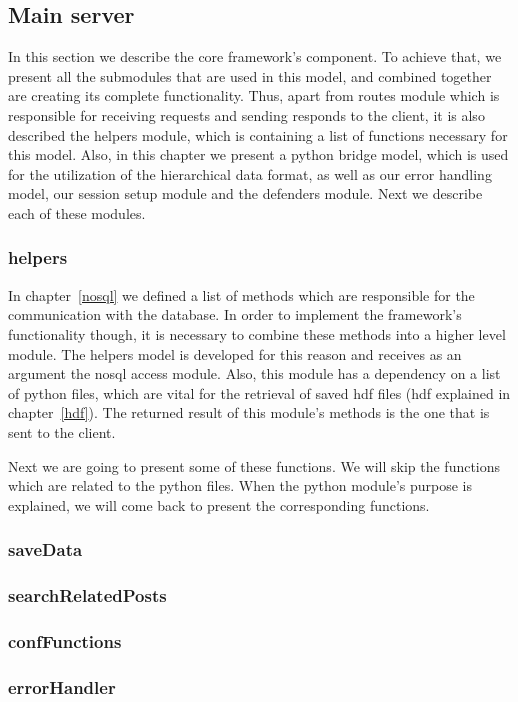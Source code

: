 \subsection{Main server}
In this section we describe the core framework's component. To achieve that, we present all the submodules that are used in this model, and combined together are creating its complete functionality. Thus, apart from routes module which is responsible for receiving requests and sending responds to the client, it is also described the helpers module, which is containing a list of functions necessary for this model. Also, in this chapter we present a python bridge model, which is used for the utilization of the hierarchical data format, as well as our error handling model, our session setup module and the defenders module. Next we describe each of these modules.

\subsubsection{helpers}
In chapter~\ref{nosql} we defined a list of methods which are responsible for the communication with the database. In order to implement the framework's functionality though, it is necessary to combine these methods into a higher level module. The helpers model is developed for this reason and receives as an argument the nosql access module. Also, this module has a dependency on a list of python files, which are vital for the retrieval of saved hdf files (hdf explained in chapter~\ref{hdf}). The returned result of this module's methods is the one that is sent to the client. \par
	Next we are going to present some of these functions. We will skip the functions which are related to the python files. When the python module's purpose is explained, we will come back to present the corresponding functions.

\subsubsection{saveData}

\subsubsection{searchRelatedPosts}

\subsubsection{confFunctions}

\subsubsection{errorHandler}

